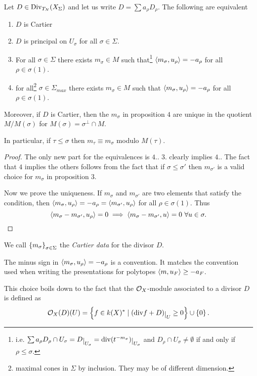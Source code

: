 \begin{proposition}[]\label{PrInvariantCartierDivisorsCorrespondToCartierData}
Let $D\in \operatorname{Div}_{T_N}(X_\Sigma)$ and let us write $D=\sum a_\rho D_\rho$. The following are equivalent
\begin{enumerate}
\item $D$ is Cartier
\item $D$ is principal on $U_\sigma$ for all $\sigma\in \Sigma$.
\item For all $\sigma\in \Sigma$ there exists $m_\sigma\in M$ such that\footnote{i.e. $\sum a_\rho D_\rho\cap U_\sigma=D\res{U_\sigma}=\div(t^{-m_\sigma})\res{U_\sigma}$ and $D_\rho\cap U_\sigma\neq \emptyset$ if and only if $\rho\leq \sigma$.} $\left\langle {m_\sigma,u_\rho}\right\rangle=-a_\rho$ for all $\rho\in \sigma(1)$.
\item for all\footnote{maximal cones in $\Sigma$ by inclusion. They may be of different dimension.} $\sigma\in \Sigma_{max}$ there exists $m_\sigma\in M$ such that $\left\langle {m_\sigma,u_\rho}\right\rangle=-a_\rho$ for all $\rho\in \sigma(1)$.
\end{enumerate}
Moreover, if $D$ is Cartier, then the $m_\sigma$ in proposition $4$ are unique in the quotient $M/M(\sigma)$ for $M(\sigma)=\sigma^\perp\cap M$.

In particular, if $\tau\leq \sigma$ then $m_\tau\equiv m_\sigma$ modulo $M(\tau)$.
\end{proposition}
\begin{proof}
The only new part for the equivalences is $4.$. $3.$ clearly implies $4.$. The fact that $4$ implies the others follows from the fact that if $\sigma\leq \sigma'$ then $m_{\sigma'}$ is a valid choice for $m_\sigma$ in proposition 3.

Now we prove the uniqueness. If $m_\sigma$ and $m_{\sigma'}$ are two elements that satisfy the condition, then $\left\langle {m_\sigma,u_\rho}\right\rangle=-a_\rho=\left\langle {m_{\sigma'},u_\rho}\right\rangle$ for all $\rho\in \sigma(1)$. Thus
\[\left\langle {m_\sigma-m_{\sigma'},u_\rho}\right\rangle=0\implies \left\langle {m_\sigma-m_{\sigma'},u}\right\rangle=0\ \forall u\in \sigma.\]
\end{proof}


\begin{notation}
We call $\left\{{m_\sigma}\right\}_{\sigma\in \Sigma}$ the \textit{Cartier data} for the divisor $D$.
\end{notation}

\begin{remark}
The minus sign in $\left\langle {m_\sigma,u_\rho}\right\rangle=-a_\rho$ is a convention. It matches the convention used when writing the presentations for polytopes $\left\langle {m,u_F}\right\rangle\geq -a_F$.

This choice boils down to the fact that the $\mathcal{O}_X$-module associated to a divisor $D$ is defined as
\[\Oc_X(D)(U)=\cpa{f\in k(X)^\ast\mid (\div f+D)\res U\geq 0}\cup\cpa{0}.\]
\end{remark}



